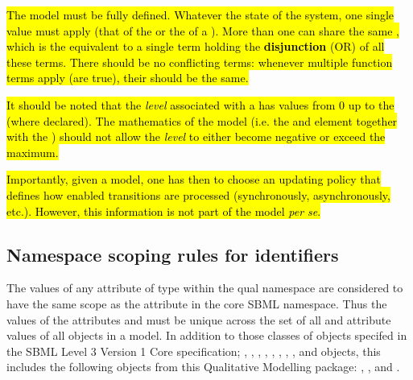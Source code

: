 \hl{The model must be fully defined. Whatever the state of the system, one single value must apply (that of the \DefaultTerm or the  of a \FunctionTerm). More than one \FunctionTerm can share the same , which is the equivalent to a single term holding the {\bf disjunction} (OR) of all these terms.  There should be no conflicting terms:  whenever multiple function terms apply (are true), their  should be the same. }

\hl{It should be noted that the \emph{level} associated with a \QualitativeSpecies has values from 0 up to the  (where declared). The mathematics of the model (i.e. the \FunctionTerm and \DefaultTerm element together with the ) should not allow the \emph{level} to either become negative or exceed the maximum.}

\hl{Importantly, given a model, one has then to choose an updating policy that defines how enabled transitions are processed (synchronously, asynchronously, etc.). However, this information is not part of the model {\em per se}. }

\pagebreak


\subsection{Namespace scoping rules for identifiers}
\label{sec:ns-id}

The values of any  attribute  of type  within the qual namespace are considered to have the same scope as the  attribute in the core SBML namespace. Thus the values of the attributes
   and  must be unique across the set of all  and
   attribute values of all objects in a model. In addition to those classes of objects specifed in the SBML Level 3 Version 1 Core specification;
  \Model, \FunctionDefinition, \Compartment,
  \Species, \Reaction, \SpeciesReference, \ModifierSpeciesReference,
  \Event, and \Parameter objects, this includes the following objects from this Qualitative Modelling package: \QualitativeSpecies, \Transition, 
  \Input and \Output.

